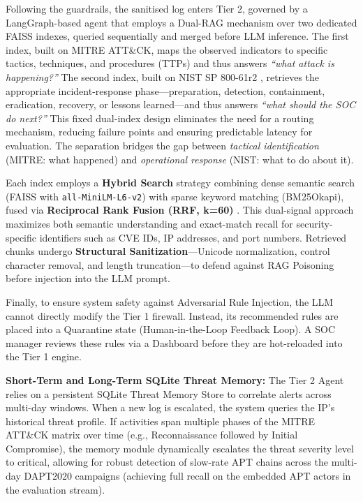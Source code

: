 \documentclass[12pt,a4paper]{article}
\begin{document}
Following the guardrails, the sanitised log enters Tier 2, governed by a LangGraph-based agent that employs a Dual-RAG mechanism over two dedicated FAISS indexes, queried sequentially and merged before LLM inference. The first index, built on MITRE ATT\&CK, maps the observed indicators to specific tactics, techniques, and procedures (TTPs) and thus answers \textit{``what attack is happening?''} The second index, built on NIST SP 800-61r2 \cite{nist80061}, retrieves the appropriate incident-response phase---preparation, detection, containment, eradication, recovery, or lessons learned---and thus answers \textit{``what should the SOC do next?''}
This fixed dual-index design eliminates the need for a routing mechanism, reducing failure points and ensuring predictable latency for evaluation. The separation bridges the gap between \textit{tactical identification} (MITRE: what happened) and \textit{operational response} (NIST: what to do about it).

Each index employs a \textbf{Hybrid Search} strategy combining dense semantic search (FAISS with \verb|all-MiniLM-L6-v2|) with sparse keyword matching (BM25Okapi), fused via \textbf{Reciprocal Rank Fusion (RRF, k=60)} \cite{rrf2009}. This dual-signal approach maximizes both semantic understanding and exact-match recall for security-specific identifiers such as CVE IDs, IP addresses, and port numbers. Retrieved chunks undergo \textbf{Structural Sanitization}---Unicode normalization, control character removal, and length truncation---to defend against RAG Poisoning before injection into the LLM prompt.

Finally, to ensure system safety against Adversarial Rule Injection, the LLM cannot directly modify the Tier 1 firewall. Instead, its recommended rules are placed into a Quarantine state (Human-in-the-Loop Feedback Loop). A SOC manager reviews these rules via a Dashboard before they are hot-reloaded into the Tier 1 engine.

\textbf{Short-Term and Long-Term SQLite Threat Memory:} The Tier 2 Agent relies on a persistent SQLite Threat Memory Store to correlate alerts across multi-day windows. When a new log is escalated, the system queries the IP's historical threat profile. If activities span multiple phases of the MITRE ATT\&CK matrix over time (e.g., Reconnaissance followed by Initial Compromise), the memory module dynamically escalates the threat severity level to critical, allowing for robust detection of slow-rate APT chains across the multi-day DAPT2020 campaigns (achieving full recall on the embedded APT actors in the evaluation stream).
\end{document}
